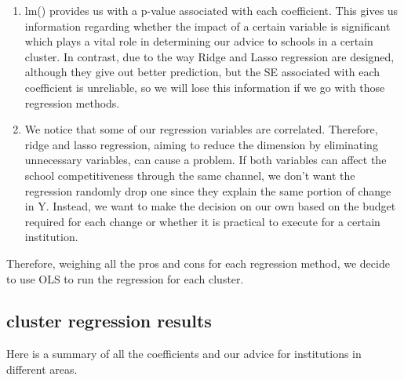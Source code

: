 \documentclass{article}
\begin{document}
\begin{enumerate}
  \item lm() provides us with a p-value associated with each coefficient. This gives us information regarding whether the impact of a certain variable is significant which plays a vital role in determining our advice to schools in a certain cluster. In contrast, due to the way Ridge and Lasso regression are designed, although they give out better prediction, but the SE associated with each coefficient is unreliable, so we will lose this information if we go with those regression methods.

  \item We notice that some of our regression variables are correlated. Therefore, ridge and lasso regression, aiming to reduce the dimension by eliminating unnecessary variables, can cause a problem. If both variables can affect the school competitiveness through the same channel, we don't want the regression randomly drop one since they explain the same portion of change in Y. Instead, we want to make the decision on our own based on the budget required for each change or whether it is practical to execute for a certain institution.
\end{enumerate}
Therefore, weighing all the pros and cons for each regression method, we decide to use OLS to run the regression for each cluster.\\

\subsection{cluster regression results}
Here is a summary of all the coefficients and our advice for institutions in different areas.\\
\end{document}
